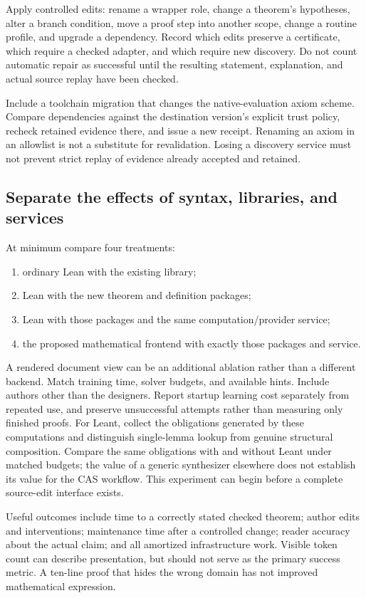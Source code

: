 \documentclass[11pt,letterpaper]{article}
\begin{document}
Apply controlled edits: rename a wrapper role, change a theorem's hypotheses,
alter a branch condition, move a proof step into another scope, change a
routine profile, and upgrade a dependency. Record which edits preserve a
certificate, which require a checked adapter, and which require new discovery.
Do not count automatic repair as successful until the resulting statement,
explanation, and actual source replay have been checked.

Include a toolchain migration that changes the native-evaluation axiom scheme.
Compare dependencies against the destination version's explicit trust policy,
recheck retained evidence there, and issue a new receipt. Renaming an axiom in
an allowlist is not a substitute for revalidation. Losing a discovery service
must not prevent strict replay of evidence already accepted and retained.

\subsection{Separate the effects of syntax, libraries, and services}
At minimum compare four treatments:
\begin{enumerate}
\item ordinary Lean with the existing library;
\item Lean with the new theorem and definition packages;
\item Lean with those packages and the same computation/provider service;
\item the proposed mathematical frontend with exactly those packages and service.
\end{enumerate}
A rendered document view can be an additional ablation rather than a different
backend. Match training time, solver budgets, and available hints. Include
authors other than the designers. Report startup learning cost separately from
repeated use, and preserve unsuccessful attempts rather than measuring only
finished proofs. For Leant, collect the obligations generated by these
computations and distinguish single-lemma lookup from genuine structural
composition. Compare the same obligations with and without Leant under matched
budgets; the value of a generic synthesizer elsewhere does not establish its
value for the CAS workflow. This experiment can begin before a complete
source-edit interface exists.

Useful outcomes include time to a correctly stated checked theorem; author
edits and interventions; maintenance time after a controlled change; reader
accuracy about the actual claim; and all amortized infrastructure work.
Visible token count can describe presentation, but should not serve as the
primary success metric. A ten-line proof that hides the wrong domain has not
improved mathematical expression.
\end{document}
